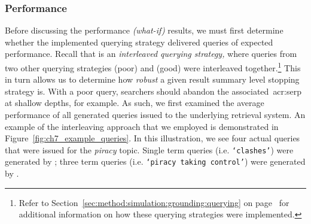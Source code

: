 \subsubsection{Performance}\label{sec:snippets:simulations:results:perf}
Before discussing the performance \emph{(what-if)} results, we must first determine whether the implemented querying strategy  delivered queries of expected performance. Recall that  is an \emph{interleaved querying strategy,} where queries from two other querying strategies  (poor) and  (good) were interleaved together.\footnote{Refer to Section~\ref{sec:method:simulation:grounding:querying} on page~\pageref{sec:method:simulation:grounding:querying} for additional information on how these querying strategies were implemented.} This in turn allows us to determine how \emph{robust} a given result summary level stopping strategy is. With a poor query, searchers should abandon the associated~\gls{acr:serp} at shallow depths, for example. As such, we first examined the average performance of all generated queries issued to the underlying retrieval system. An example of the interleaving approach that we employed is demonstrated in Figure~\ref{fig:ch7_example_queries}. In this illustration, we see four actual queries that were issued for the \emph{piracy} topic. Single term queries (i.e. \texttt{`clashes'}) were generated by ; three term queries (i.e. \texttt{`piracy taking control'}) were generated by .


